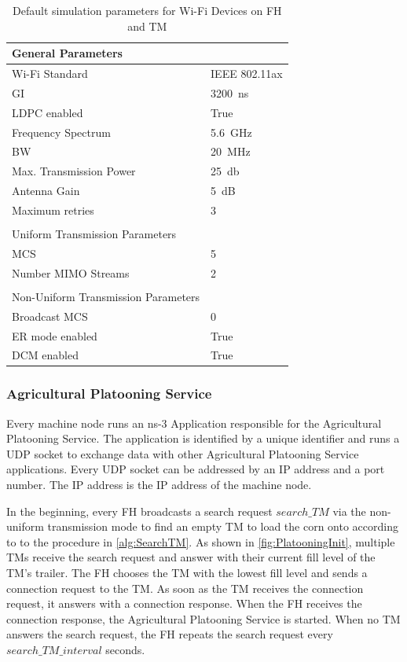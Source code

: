 \begin{table}[H]
   \centering
   \begin{tabular}{p{6cm}p{4cm}}
      General Parameters & \\
      \midrule
      Wi-Fi Standard & IEEE 802.11ax\\
      \ac{GI} & \SI{3200}{\nano\second}\\
      \ac{LDPC} enabled & True\\
      Frequency Spectrum & \SI{5.6}{\giga\hertz}\\
      \ac{BW} & \SI{20}{\mega\hertz}\\
      Max. Transmission Power & \SI{25}{\decibel}\\
      Antenna Gain & \SI{5}{\dB}\\
      Maximum retries & \num{3}\\
       & \\
      Uniform Transmission Parameters & \\
      \midrule
      \ac{MCS} & \num{5}\\
      Number \ac{MIMO} Streams & \num{2}\\
       & \\
      Non-Uniform Transmission Parameters & \\
      \midrule
      Broadcast \ac{MCS} & \num{0}\\
      \ac{ER} mode enabled & True\\
      \ac{DCM} enabled & True\\
   \end{tabular}
   \caption{Default simulation parameters for Wi-Fi Devices on \acf{FH} and \acf{TM}}
   \label{tab:SimulationParametersWiFi}
\end{table}

\subsubsection*{Agricultural Platooning Service}
Every machine node runs an ns-3 Application responsible for the Agricultural Platooning Service.
The application is identified by a unique identifier and runs a UDP socket to exchange data with other Agricultural Platooning Service applications.
Every UDP socket can be addressed by an IP address and a port number.
The IP address is the IP address of the machine node.

In the beginning, every \ac{FH} broadcasts a search request $search\_TM$ via the non-uniform transmission mode to find an empty \ac{TM} to load the corn onto according to
to the procedure in \autoref{alg:SearchTM}.
As shown in \autoref{fig:PlatooningInit}, multiple \ac{TM}s receive the search request and answer with
their current fill level of the \ac{TM}'s trailer.
The \ac{FH} chooses the \ac{TM} with the lowest fill level and sends a connection request to the \ac{TM}.
As soon as the \ac{TM} receives the connection request, it answers with a connection response.
When the \ac{FH} receives the connection response, the Agricultural Platooning Service is started.
When no \ac{TM} answers the search request, the \ac{FH} repeats the search request every $search\_TM\_interval$ seconds.

